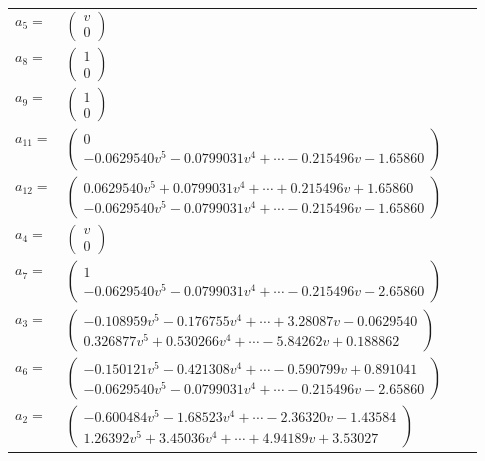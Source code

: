 \documentclass[1p]{elsarticle_modified}
\theoremstyle{definition}
\begin{document}
\begin{tabular}{m{7pt} m{180pt} m{7pt} m{180pt} }
\flushright $a_{5}=$&$\begin{pmatrix}v\\0\end{pmatrix}$ \\
\flushright $a_{8}=$&$\begin{pmatrix}1\\0\end{pmatrix}$ \\
\flushright $a_{9}=$&$\begin{pmatrix}1\\0\end{pmatrix}$ \\
\flushright $a_{11}=$&$\begin{pmatrix}0\\-0.0629540 v^{5}-0.0799031 v^{4}+\cdots-0.215496 v-1.65860\end{pmatrix}$ \\
\flushright $a_{12}=$&$\begin{pmatrix}0.0629540 v^{5}+0.0799031 v^{4}+\cdots+0.215496 v+1.65860\\-0.0629540 v^{5}-0.0799031 v^{4}+\cdots-0.215496 v-1.65860\end{pmatrix}$ \\
\flushright $a_{4}=$&$\begin{pmatrix}v\\0\end{pmatrix}$ \\
\flushright $a_{7}=$&$\begin{pmatrix}1\\-0.0629540 v^{5}-0.0799031 v^{4}+\cdots-0.215496 v-2.65860\end{pmatrix}$ \\
\flushright $a_{3}=$&$\begin{pmatrix}-0.108959 v^{5}-0.176755 v^{4}+\cdots+3.28087 v-0.0629540\\0.326877 v^{5}+0.530266 v^{4}+\cdots-5.84262 v+0.188862\end{pmatrix}$ \\
\flushright $a_{6}=$&$\begin{pmatrix}-0.150121 v^{5}-0.421308 v^{4}+\cdots-0.590799 v+0.891041\\-0.0629540 v^{5}-0.0799031 v^{4}+\cdots-0.215496 v-2.65860\end{pmatrix}$ \\
\flushright $a_{2}=$&$\begin{pmatrix}-0.600484 v^{5}-1.68523 v^{4}+\cdots-2.36320 v-1.43584\\1.26392 v^{5}+3.45036 v^{4}+\cdots+4.94189 v+3.53027\end{pmatrix}$ \\

\end{tabular}
\end{document}
